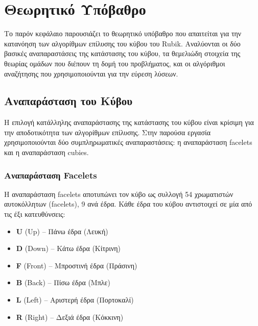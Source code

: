 
\chapter{Θεωρητικό Υπόβαθρο}
\label{ch:background}

Το παρόν κεφάλαιο παρουσιάζει το θεωρητικό υπόβαθρο που απαιτείται για την κατανόηση των αλγορίθμων επίλυσης του κύβου του Rubik. Αναλύονται οι δύο βασικές αναπαραστάσεις της κατάστασης του κύβου, τα θεμελιώδη στοιχεία της θεωρίας ομάδων που διέπουν τη δομή του προβλήματος, και οι αλγόριθμοι αναζήτησης που χρησιμοποιούνται για την εύρεση λύσεων.

\section{Αναπαράσταση του Κύβου}
\label{sec:bg_representation}

Η επιλογή κατάλληλης αναπαράστασης της κατάστασης του κύβου είναι κρίσιμη για την αποδοτικότητα των αλγορίθμων επίλυσης. Στην παρούσα εργασία χρησιμοποιούνται δύο συμπληρωματικές αναπαραστάσεις: η αναπαράσταση facelets και η αναπαράσταση cubies.

\subsection{Αναπαράσταση Facelets}
\label{subsec:facelet_repr}

Η αναπαράσταση facelets αποτυπώνει τον κύβο ως συλλογή 54 χρωματιστών αυτοκόλλητων (facelets), 9 ανά έδρα. Κάθε έδρα του κύβου αντιστοιχεί σε μία από τις έξι κατευθύνσεις:

\begin{itemize}
    \item \textbf{U} (Up) -- Πάνω έδρα (Λευκή)
    \item \textbf{D} (Down) -- Κάτω έδρα (Κίτρινη)
    \item \textbf{F} (Front) -- Μπροστινή έδρα (Πράσινη)
    \item \textbf{B} (Back) -- Πίσω έδρα (Μπλε)
    \item \textbf{L} (Left) -- Αριστερή έδρα (Πορτοκαλί)
    \item \textbf{R} (Right) -- Δεξιά έδρα (Κόκκινη)
\end{itemize}

